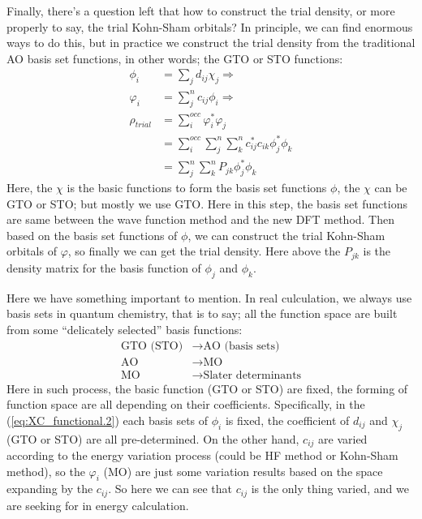 Finally, there's a question left that how to construct the trial
density, or more properly to say, the trial Kohn-Sham orbitals? In
principle, we can find enormous ways to do this, but in practice we
construct the trial density from the traditional AO basis set
functions, in other words;  the GTO or STO functions:
\begin{align}
  \label{eq:XC_functional.2}
\phi_{i} &= \sum_{j}d_{ij}\chi_{j} \Rightarrow \nonumber \\
\varphi_{i} &= \sum_{j}^{n}c_{ij}\phi_{i} \Rightarrow \nonumber \\
\rho_{trial} &= \sum_{i}^{occ}\varphi_{i}^{*}\varphi_{j} \nonumber \\
&=
\sum_{i}^{occ}\sum_{j}^{n}\sum_{k}^{n}c_{ij}^{*}c_{ik}\phi_{j}^{*}
\phi_{k}
\nonumber \\
&= \sum_{j}^{n}\sum_{k}^{n}P_{jk}\phi_{j}^{*}\phi_{k}
\end{align}
Here, the $\chi$ is the basic functions to form the basis set
functions
$\phi$, the $\chi$ can be GTO or STO; but mostly we use GTO. Here in
this step, the basis set functions are same between the wave function
method and the new DFT method. Then based on the basis set functions
of $\phi$, we can construct the trial Kohn-Sham orbitals of $\varphi$,
so finally we can get the trial density. Here above the $P_{jk}$ is
the density matrix for the basis function of $\phi_{j}$ and
$\phi_{k}$. 

Here we have something important to mention. In real culculation, we
always use basis sets in quantum chemistry, that is to say; all the
function space are built from some ``delicately selected'' basis
functions:
\begin{align}
 \label{basis_idea_funtional_eq:1}
\text{GTO (STO)} &\longrightarrow \text{AO  (basis sets)} \nonumber \\
\text{AO} &\longrightarrow \text{MO} \nonumber \\
\text{MO} &\longrightarrow \text{Slater determinants}
\end{align}
Here in such process, the basic function (GTO or STO) are fixed, the
forming of function space are all depending on their coefficients.
Specifically, in the (\ref{eq:XC_functional.2}) each basis sets of
$\phi_{i}$ is fixed, the coefficient of $d_{ij}$ and $\chi_{j}$ (GTO
or STO) are all pre-determined. On the other hand, $c_{ij}$ are
varied according to the energy variation process (could be HF method
or Kohn-Sham method), so the $\varphi_{i}$ (MO) are just some
variation results based on the space expanding by the $c_{ij}$. So
here we can see that $c_{ij}$ is the only thing varied, and we are
seeking for in energy calculation. 

